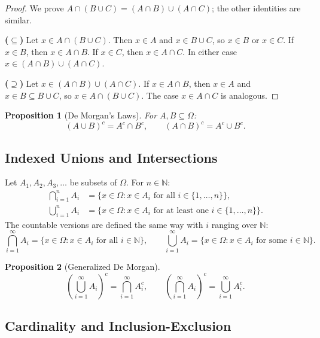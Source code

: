 \documentclass{article}
\newtheorem{proposition}{Proposition}
\begin{document}
\begin{proof}
We prove $A \cap (B \cup C) = (A \cap B) \cup (A \cap C)$; the other identities are similar.

\textbf{($\subseteq$)} Let $x \in A \cap (B \cup C)$. Then $x \in A$ and $x \in B \cup C$, so $x \in B$ or $x \in C$. If $x \in B$, then $x \in A \cap B$. If $x \in C$, then $x \in A \cap C$. In either case $x \in (A \cap B) \cup (A \cap C)$.

\textbf{($\supseteq$)} Let $x \in (A \cap B) \cup (A \cap C)$. If $x \in A \cap B$, then $x \in A$ and $x \in B \subseteq B \cup C$, so $x \in A \cap (B \cup C)$. The case $x \in A \cap C$ is analogous.
\end{proof}

\begin{proposition}[De Morgan's Laws]
For $A, B \subseteq \Omega$:
\[
(A \cup B)^c = A^c \cap B^c, \qquad (A \cap B)^c = A^c \cup B^c.
\]
\end{proposition}

\subsection{Indexed Unions and Intersections}

Let $A_1, A_2, A_3, \ldots$ be subsets of $\Omega$. For $n \in \mathbb{N}$:
\begin{align*}
\bigcap_{i=1}^n A_i &= \{x \in \Omega : x \in A_i \text{ for all } i \in \{1, \ldots, n\}\},\\
\bigcup_{i=1}^n A_i &= \{x \in \Omega : x \in A_i \text{ for at least one } i \in \{1, \ldots, n\}\}.
\end{align*}
The countable versions are defined the same way with $i$ ranging over $\mathbb{N}$:
\[
\bigcap_{i=1}^\infty A_i = \{x \in \Omega : x \in A_i \text{ for all } i \in \mathbb{N}\}, \qquad \bigcup_{i=1}^\infty A_i = \{x \in \Omega : x \in A_i \text{ for some } i \in \mathbb{N}\}.
\]

\begin{proposition}[Generalized De Morgan]
\[
\left(\bigcup_{i=1}^\infty A_i\right)^c = \bigcap_{i=1}^\infty A_i^c, \qquad \left(\bigcap_{i=1}^\infty A_i\right)^c = \bigcup_{i=1}^\infty A_i^c.
\]
\end{proposition}

\subsection{Cardinality and Inclusion-Exclusion}
\end{document}

